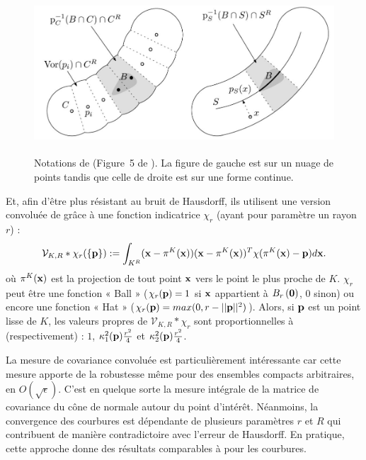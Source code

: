 \begin{figure}[ht]{
    \begin{center}
    \includegraphics[height=6cm]{images/Feature/VCM_notations}
    \end{center}}
    \caption[Notations de \VCM.]{Notations de \VCM (Figure~5 de \cite{Merigot2011}). La figure de gauche est sur un nuage de points tandis que celle de droite est sur une forme continue. \label{fig:VCM-multiscale-c}}
\end{figure}

Et, afin d'être plus résistant au bruit de Hausdorff, ils utilisent une
version convoluée de \VCM grâce à une fonction indicatrice $\chi_r$
(ayant pour paramètre un rayon $r$) :
%
\begin{equation}
  \mathcal{V}_{K,R} \ast \chi_r(\{\mathbf{p}\}) := \int_{K^R} (\mathbf{x} - \pi^K(\mathbf{x}))(\mathbf{x} - \pi^K(\mathbf{x}))^T \chi(\pi^K(\mathbf{x}) - \mathbf{p}) d\mathbf{x} .
\end{equation}
%
où $\pi^K(\mathbf{x})$ est la projection de tout point $\mathbf{x}$ vers le point le plus
proche de $K$. $\chi_r$ peut être une fonction « Ball » ($\chi_r(\mathbf{p}) = 1$ si
$\mathbf{x}$ appartient à $B_{r}\left(\mathbf{0}\right)$, $0$ sinon) ou encore une fonction «
Hat » ($\chi_r(\mathbf{p}) = max(0, r - ||\mathbf{p}||^2)$).
%
Alors, si $\mathbf{p}$ est un point lisse de $K$, les valeurs propres de
$\mathcal{V}_{K,R} \ast \chi_r$ sont proportionnelles à (respectivement) : $1$,
$\kappa_{1}^2(\mathbf{p})\frac{r^2}{4}$ et $\kappa_{2}^2(\mathbf{p})\frac{r^2}{4}$.
%


%
La mesure de covariance convoluée est particulièrement intéressante car cette
mesure apporte de la robustesse même pour des ensembles compacts arbitraires, en
$O(\sqrt{\epsilon})$. C'est en quelque sorte la mesure intégrale de la matrice
de covariance du cône de normale autour du point d'intérêt. Néanmoins, la
convergence des courbures est dépendante de plusieurs paramètres $r$ et $R$ qui
contribuent de manière contradictoire avec l'erreur de Hausdorff. En pratique,
cette approche donne des résultats comparables à \JetFitting pour les courbures.

